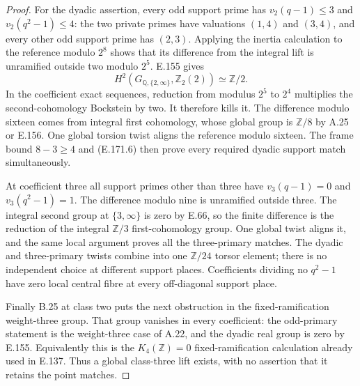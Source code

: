 \begin{proof}
For the dyadic assertion, every odd support prime has
\(v_2(q-1)\le3\) and \(v_2(q^2-1)\le4\): the two private
primes have valuations \((1,4)\) and \((3,4)\), and every
other odd support prime has \((2,3)\). Applying the inertia
calculation to the reference modulo \(2^8\) shows that its
difference from the integral lift is unramified outside two
modulo \(2^5\). E.155 gives
\[
 H^2(G_{\mathbb Q,\{2,\infty\}},\mathbb Z_2(2))\simeq\mathbb Z/2.
 \tag{E.171.7}
\]
In the coefficient exact sequences, reduction from modulus
\(2^5\) to \(2^4\) multiplies the second-cohomology Bockstein
by two. It therefore kills it. The difference modulo sixteen
comes from integral first cohomology, whose global group is
\(\mathbb Z/8\) by A.25 or E.156. One global torsion twist
aligns the reference modulo sixteen. The frame bound
\(8-3\ge4\) and (E.171.6) then prove every required dyadic
support match simultaneously.

At coefficient three all support primes other than three have
\(v_3(q-1)=0\) and \(v_3(q^2-1)=1\).
The difference modulo nine is unramified outside three.
The integral second group at \(\{3,\infty\}\) is zero by
E.66, so the finite difference is the reduction of the integral
\(\mathbb Z/3\) first-cohomology group. One global twist aligns
it, and the same local argument proves all the three-primary
matches. The dyadic and three-primary twists combine into one
\(\mathbb Z/24\) torsor element; there is no independent choice
at different support places. Coefficients dividing no \(q^2-1\)
have zero local central fibre at every off-diagonal support place.

Finally B.25 at class two puts the next obstruction in the
fixed-ramification weight-three group. That group vanishes in
every coefficient: the odd-primary statement is the weight-three
case of A.22, and the dyadic real group is zero by E.155.
Equivalently this is the \(K_4(\mathbb Z)=0\) fixed-ramification
calculation already used in E.137. Thus a global class-three lift
exists, with no assertion that it retains the point matches.
\end{proof}

